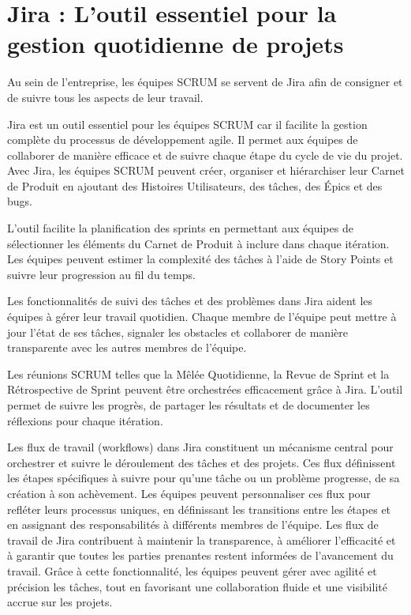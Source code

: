 \section[Jira : L'outil essentiel pour la gestion de projets]{Jira : L'outil essentiel pour la gestion quotidienne de projets}\label{sec:jira}

Au sein de l'entreprise, les équipes SCRUM se servent de Jira afin de consigner et de suivre tous les aspects de leur travail.

Jira est un outil essentiel pour les équipes SCRUM car il facilite la gestion complète du processus de développement agile. Il permet aux équipes de collaborer de manière efficace et de suivre chaque étape du cycle de vie du projet. Avec Jira, les équipes SCRUM peuvent créer, organiser et hiérarchiser leur Carnet de Produit en ajoutant des Histoires Utilisateurs, des tâches, des Épics et des bugs.

L'outil facilite la planification des sprints en permettant aux équipes de sélectionner les éléments du Carnet de Produit à inclure dans chaque itération. Les équipes peuvent estimer la complexité des tâches à l'aide de Story Points et suivre leur progression au fil du temps.

Les fonctionnalités de suivi des tâches et des problèmes dans Jira aident les équipes à gérer leur travail quotidien. Chaque membre de l'équipe peut mettre à jour l'état de ses tâches, signaler les obstacles et collaborer de manière transparente avec les autres membres de l'équipe.

Les réunions SCRUM telles que la Mêlée Quotidienne, la Revue de Sprint et la Rétrospective de Sprint peuvent être orchestrées efficacement grâce à Jira. L'outil permet de suivre les progrès, de partager les résultats et de documenter les réflexions pour chaque itération.

Les flux de travail (workflows) dans Jira constituent un mécanisme central pour orchestrer et suivre le déroulement des tâches et des projets. Ces flux définissent les étapes spécifiques à suivre pour qu'une tâche ou un problème progresse, de sa création à son achèvement. Les équipes peuvent personnaliser ces flux pour refléter leurs processus uniques, en définissant les transitions entre les étapes et en assignant des responsabilités à différents membres de l'équipe. Les flux de travail de Jira contribuent à maintenir la transparence, à améliorer l'efficacité et à garantir que toutes les parties prenantes restent informées de l'avancement du travail. Grâce à cette fonctionnalité, les équipes peuvent gérer avec agilité et précision les tâches, tout en favorisant une collaboration fluide et une visibilité accrue sur les projets.

